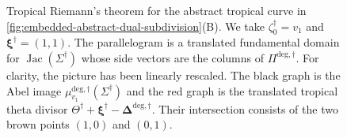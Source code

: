 \documentclass[12pt]{amsart}
\numberwithin{equation}{section}
\theoremstyle{definition}
\def\trop{\dagger}
\def\jac{{\operatorname{Jac}}}
\def\vecRC{\bm{\Delta}}
\def\vecptjac{\bm{\xi}}
\def\ptSig{\zeta}
\def\baseptT{{\ptSig_0^\trop}}
\def\mcurve{\Sigma}
\def\tropmcurve{\mcurve^\trop}
\begin{document}
\begin{figure}

\caption{
Tropical Riemann's theorem for the abstract tropical curve in
\cref{fig:embedded-abstract-dual-subdivision}(B).
We take $\baseptT=v_1$ and
$\vecptjac^\trop=(1,1)$.
The parallelogram is a translated fundamental domain for
$\jac(\tropmcurve)$ whose side vectors are the columns of
$\Pi^{\mathrm{deg},\trop}$. For clarity, the picture has been linearly rescaled. The black graph is the Abel image
$\mu_{v_1}^{\mathrm{deg},\trop}(\tropmcurve)$
and the red graph is the translated tropical theta divisor
$\Theta^\trop+\vecptjac^\trop-\vecRC^{\mathrm{deg},\trop}$.
Their intersection consists of the two brown points $(1,0)$ and $(0,1)$.
}
\label{fig:tropical-riemann-non-smooth}

\end{figure}
\end{document}
